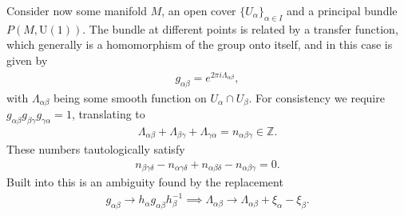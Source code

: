 Consider now some manifold $M$, an open cover $\{U_{\alpha}\}_{\alpha\in I}$ and a principal bundle $P(M, \text{U}(1))$. The bundle at different points is related by a transfer function, which generally is a homomorphism of the group onto itself, and in this case is given by
\begin{align*}
	g_{\alpha\beta} = e^{2\pi i\Lambda_{\alpha\beta}},
\end{align*}
with $\Lambda_{\alpha\beta}$ being some smooth function on $U_{\alpha}\cap U_{\beta}$. For consistency we require $g_{\alpha\beta}g_{\beta\gamma}g_{\gamma\alpha} = 1$, translating to
\begin{align*}
	\Lambda_{\alpha\beta} + \Lambda_{\beta\gamma} + \Lambda_{\gamma\alpha} = n_{\alpha\beta\gamma}\in\mathbb{Z}.
\end{align*}
These numbers tautologically satisfy
\begin{align*}
	n_{\beta\gamma\delta} - n_{\alpha\gamma\delta} + n_{\alpha\beta\delta} - n_{\alpha\beta\gamma} = 0.
\end{align*}
Built into this is an ambiguity found by the replacement
\begin{align*}
	g_{\alpha\beta} \to h_{\alpha}g_{\alpha\beta}h_{\beta}^{-1}\implies \Lambda_{\alpha\beta} \to \Lambda_{\alpha\beta} + \xi_{\alpha} - \xi_{\beta}.
\end{align*}

